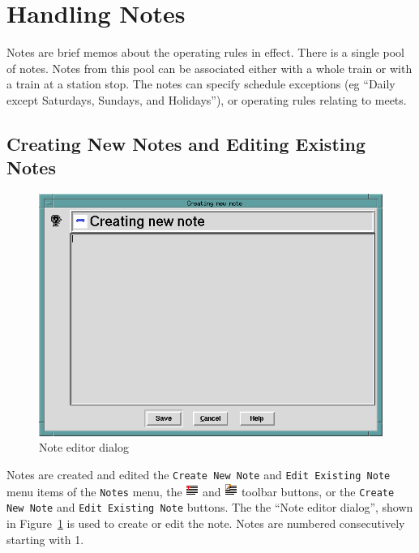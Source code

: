 \section{Handling Notes}

Notes are brief memos about the operating rules in effect.  There is a
single pool of notes.  Notes from this pool can be associated either
with a whole train or with a train at a station stop.  The notes can
specify schedule exceptions (eg ``Daily except Saturdays, Sundays, and
Holidays''), or operating rules relating to meets.

\subsection{Creating New Notes and Editing Existing Notes}

\begin{figure}[hbpt]
\begin{centering}   
\includegraphics[width=5in]{TTEditNote.png}
\caption{Note editor dialog}
\label{fig:tt:EditNote}
\end{centering}
\end{figure}
Notes are created and edited the \texttt{Create New Note} and
\texttt{Edit Existing Note} menu items of the \texttt{Notes} menu, the
\includegraphics{TTcreatenote.png} and \includegraphics{TTeditnote.png}
toolbar buttons, or the \texttt{Create New Note} and 
\texttt{Edit Existing Note} buttons.  The the ``Note editor dialog'', shown in
Figure~\ref{fig:tt:EditNote} is used to create or edit the note.  Notes are
numbered consecutively starting with 1.

